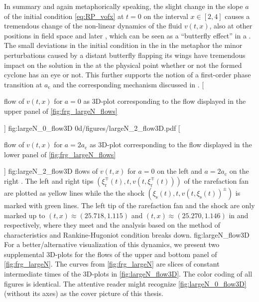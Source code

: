 In summary and again metaphorically speaking, the slight change in the slope $a$ of the initial condition \eqref{eq:RP_vofx} at $t=0$ on the interval $x \in [ 2, 4 ]$ causes a tremendous change of the non-linear dynamics of the fluid $v ( t, x )$, also at other positions in field space and later \rgtimes{}, which can be seen as a ``butterfly effect'' in a \qft{}.
The small deviations in the initial condition in the \uv{} \dash{} in the metaphor the minor perturbations caused by a distant butterfly flapping its wings  \dash{} have tremendous impact on the solution in the \ir{} at the physical point \dash{} whether or not the formed cyclone has an eye or not. This further supports the notion of a first-order phase transition at $a_\mathrm{c}$ and the corresponding mechanism discussed in .\bigskip
{}%
	[\caption{\frg{} flow of $v(t,x)$ for $a=0$ as 3D-plot corresponding to the flow displayed in the upper panel of \cref{fig:frg_largeN_flows}}]%
	{fig:largeN_0_flow3D}%
	{0d/figures/largeN_2_flow3D.pdf}%
	[\caption{\frg{} flow of $v ( t, x )$ for $a = 2 a_\mathrm{c}$ as 3D-plot corresponding to the flow displayed in the lower panel of \cref{fig:frg_largeN_flows}}]%
	{fig:largeN_2_flow3D}%
	{%
		\frg{} flows of $v ( t, x )$ for $a=0$ on the left  and $a = 2 a_\mathrm{c}$ on the right .
		The left and right tips $( \xi_\mathrm{r}^\mp ( t ), t, v( t, \xi_\mathrm{r}^\mp ( t ) ) )$ of the rarefaction fan are plotted as {yellow} lines while the the shock $( \xi_\mathrm{s} ( t ), t, v ( t, \xi_\mathrm{s} ( t ))^\pm )$ is marked with {green} lines. The left tip of the rarefaction fan and the shock are only marked up to $( t, x ) \approx ( 25.718, 1.115 )$ and $( t, x ) \approx ( 25.270, 1.146 )$ in  and  respectively, where they meet and the analysis based on the method of characteristics and Rankine-Hugoniot condition breaks down.
	}%
	{fig:largeN_flow3D}%
For a better/alternative visualization of this dynamics, we present two supplemental 3D-plots for the \frg{} flows of the upper and bottom panel of \cref{fig:frg_largeN}.
The curves from \cref{fig:frg_largeN} are slices of constant intermediate times of the 3D-plots in \cref{fig:largeN_flow3D}. 
The color coding of all figures is identical.
The attentive reader might recognize \cref{fig:largeN_0_flow3D} (without its axes) as the cover picture of this thesis.

